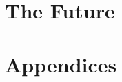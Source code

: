 \documentclass{book}
\begin{document}
\part{The Future}



\appendix
\part{Appendices}




\backmatter
\printbibliography
\end{document}
